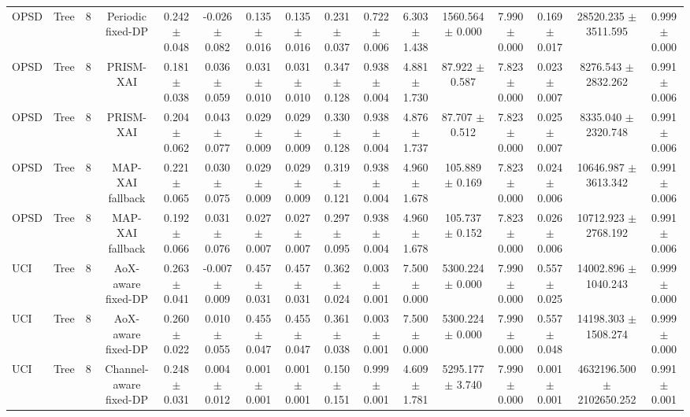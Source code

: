 \begin{tabular}{lccccccccccccccc}
OPSD & Tree & 8 & Periodic fixed-DP & 0.242 $\pm$ 0.048 & -0.026 $\pm$ 0.082 & 0.135 $\pm$ 0.016 & 0.135 $\pm$ 0.016 & 0.231 $\pm$ 0.037 & 0.722 $\pm$ 0.006 & 6.303 $\pm$ 1.438 & 1560.564 $\pm$ 0.000 & 7.990 $\pm$ 0.000 & 0.169 $\pm$ 0.017 & 28520.235 $\pm$ 3511.595 & 0.999 $\pm$ 0.000 \\
OPSD & Tree & 8 & PRISM-XAI & 0.181 $\pm$ 0.038 & 0.036 $\pm$ 0.059 & 0.031 $\pm$ 0.010 & 0.031 $\pm$ 0.010 & 0.347 $\pm$ 0.128 & 0.938 $\pm$ 0.004 & 4.881 $\pm$ 1.730 & 87.922 $\pm$ 0.587 & 7.823 $\pm$ 0.000 & 0.023 $\pm$ 0.007 & 8276.543 $\pm$ 2832.262 & 0.991 $\pm$ 0.006 \\
OPSD & Tree & 8 & PRISM-XAI & 0.204 $\pm$ 0.062 & 0.043 $\pm$ 0.077 & 0.029 $\pm$ 0.009 & 0.029 $\pm$ 0.009 & 0.330 $\pm$ 0.128 & 0.938 $\pm$ 0.004 & 4.876 $\pm$ 1.737 & 87.707 $\pm$ 0.512 & 7.823 $\pm$ 0.000 & 0.025 $\pm$ 0.007 & 8335.040 $\pm$ 2320.748 & 0.991 $\pm$ 0.006 \\
OPSD & Tree & 8 & MAP-XAI fallback & 0.221 $\pm$ 0.065 & 0.030 $\pm$ 0.075 & 0.029 $\pm$ 0.009 & 0.029 $\pm$ 0.009 & 0.319 $\pm$ 0.121 & 0.938 $\pm$ 0.004 & 4.960 $\pm$ 1.678 & 105.889 $\pm$ 0.169 & 7.823 $\pm$ 0.000 & 0.024 $\pm$ 0.006 & 10646.987 $\pm$ 3613.342 & 0.991 $\pm$ 0.006 \\
OPSD & Tree & 8 & MAP-XAI fallback & 0.192 $\pm$ 0.066 & 0.031 $\pm$ 0.076 & 0.027 $\pm$ 0.007 & 0.027 $\pm$ 0.007 & 0.297 $\pm$ 0.095 & 0.938 $\pm$ 0.004 & 4.960 $\pm$ 1.678 & 105.737 $\pm$ 0.152 & 7.823 $\pm$ 0.000 & 0.026 $\pm$ 0.006 & 10712.923 $\pm$ 2768.192 & 0.991 $\pm$ 0.006 \\
UCI & Tree & 8 & AoX-aware fixed-DP & 0.263 $\pm$ 0.041 & -0.007 $\pm$ 0.009 & 0.457 $\pm$ 0.031 & 0.457 $\pm$ 0.031 & 0.362 $\pm$ 0.024 & 0.003 $\pm$ 0.001 & 7.500 $\pm$ 0.000 & 5300.224 $\pm$ 0.000 & 7.990 $\pm$ 0.000 & 0.557 $\pm$ 0.025 & 14002.896 $\pm$ 1040.243 & 0.999 $\pm$ 0.000 \\
UCI & Tree & 8 & AoX-aware fixed-DP & 0.260 $\pm$ 0.022 & 0.010 $\pm$ 0.055 & 0.455 $\pm$ 0.047 & 0.455 $\pm$ 0.047 & 0.361 $\pm$ 0.038 & 0.003 $\pm$ 0.001 & 7.500 $\pm$ 0.000 & 5300.224 $\pm$ 0.000 & 7.990 $\pm$ 0.000 & 0.557 $\pm$ 0.048 & 14198.303 $\pm$ 1508.274 & 0.999 $\pm$ 0.000 \\
UCI & Tree & 8 & Channel-aware fixed-DP & 0.248 $\pm$ 0.031 & 0.004 $\pm$ 0.012 & 0.001 $\pm$ 0.001 & 0.001 $\pm$ 0.001 & 0.150 $\pm$ 0.151 & 0.999 $\pm$ 0.001 & 4.609 $\pm$ 1.781 & 5295.177 $\pm$ 3.740 & 7.990 $\pm$ 0.000 & 0.001 $\pm$ 0.001 & 4632196.500 $\pm$ 2102650.252 & 0.991 $\pm$ 0.001 \\

\end{tabular}
